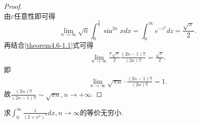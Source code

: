 \documentclass[lang=cn,newtx,10pt,scheme=chinese]{elegantbook}
\begin{document}
\begin{proof}
\[\]
由\(\varepsilon\)任意性即可得
\[
\lim_{n\rightarrow\infty}\sqrt{n}\int_{0}^{\frac{\pi}{2}}\sin^{2n}x dx=\int_{0}^{\infty}e^{-z^{2}}dz=\frac{\sqrt{\pi}}{2}.
\]
再结合\eqref{theorem4.6-1.1}式可得
\begin{align*}
\lim_{n\rightarrow \infty} \frac{\pi \sqrt{n}}{2}\frac{(2n-1)!!}{(2n)!!}=\frac{\sqrt{\pi}}{2}.
\end{align*}
即
\begin{align*}
\lim_{n\rightarrow \infty} \sqrt{\pi n}\cdot \frac{(2n-1)!!}{(2n)!!}=1.
\end{align*}
故$\frac{(2n)!!}{(2n-1)!!}\sim \sqrt{\pi n},n\rightarrow +\infty $.
\end{proof}

\begin{example}\label{Laplace方法例题1}
求\(\int_{0}^{\infty} \frac{1}{(2 + x^2)^n}dx, n \to \infty\)的等价无穷小.
\end{example}
\end{document}
